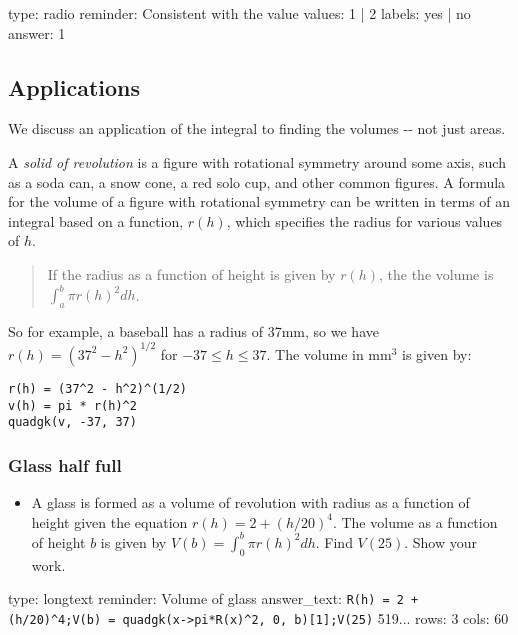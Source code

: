\documentclass[12pt]{article}
\begin{document}
\begin{answer}
type: radio
reminder: Consistent with the value
values: 1 | 2
labels: yes | no
answer: 1
\end{answer}

\subsection{Applications}

We discuss an application of the integral to finding the volumes -{}-
not just areas.

A \emph{solid of revolution} is a figure with rotational symmetry around
some axis, such as a soda can, a snow cone, a red solo cup, and other
common figures. A formula for the volume of a figure with rotational
symmetry can be written in terms of an integral based on a function,
$r(h)$, which specifies the radius for various values of $h$.

\begin{quote}
If the radius as a function of height is given by $r(h)$, the the volume
is $\int_a^b \pi r(h)^2 dh$.
\end{quote}

So for example, a baseball has a radius of 37mm, so we have
$r(h) = (37^2 - h^2)^{1/2}$ for $-37 \leq h \leq 37$. The volume in
mm$^3$ is given by:



\begin{verbatim}
r(h) = (37^2 - h^2)^(1/2)
v(h) = pi * r(h)^2
quadgk(v, -37, 37)
\end{verbatim}
\subsubsection{Glass half full}

\begin{itemize}
\itemsep1pt\parskip0pt
\item
  A glass is formed as a volume of revolution with radius as a function
  of height given the equation $r(h) = 2 + (h/20)^4$. The volume as a
  function of height $b$ is given by $V(b) = \int_0^b \pi   r(h)^2 dh$.
  Find $V(25)$. Show your work.
\end{itemize}

\begin{answer}
type: longtext
reminder: Volume of glass
answer_text: \verb#R(h) = 2 + (h/20)^4;V(b) = quadgk(x->pi*R(x)^2, 0, b)[1];V(25)# 519... 
rows: 3
cols: 60
\end{answer}
\end{document}
